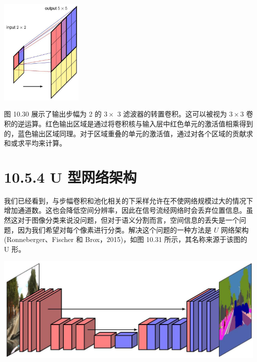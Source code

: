 \documentclass[10pt]{article}
\begin{document}
\begin{center}
\includegraphics[max width=0.3\textwidth]{images/0194e279-9b28-703a-88f4-c3ac21e2010d_338_1070_349_486_626_0.jpg}
\end{center}
\hspace*{3em} 

图 10.30 展示了输出步幅为 2 的 \(3 \times\) 3 滤波器的转置卷积。这可以被视为 \(3 \times  3\) 卷积的逆运算。红色输出区域是通过将卷积核与输入层中红色单元的激活值相乘得到的，蓝色输出区域同理。对于区域重叠的单元的激活值，通过对各个区域的贡献求和或求平均来计算。

\section*{10.5.4 U 型网络架构}

我们已经看到，与步幅卷积和池化相关的下采样允许在不使网络规模过大的情况下增加通道数。这也会降低空间分辨率，因此在信号流经网络时会丢弃位置信息。虽然这对于图像分类来说没问题，但对于语义分割而言，空间信息的丢失是一个问题，因为我们希望对每个像素进行分类。解决这个问题的一种方法是 \(U\) 网络架构(Ronneberger、Fischer 和 Brox，2015)，如图 10.31 所示，其名称来源于该图的 U 形。

\begin{center}
\includegraphics[max width=1.0\textwidth]{images/0194e279-9b28-703a-88f4-c3ac21e2010d_338_272_1411_1279_499_0.jpg}
\end{center}
\hspace*{3em} 
\end{document}
